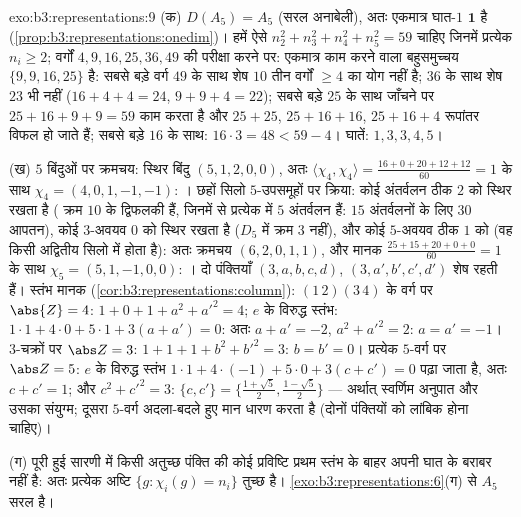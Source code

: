 \begin{solution}{exo:b3:representations:9}
(क) $D(A_5) = A_5$ (सरल अनाबेली), अतः एकमात्र घात-$1$  $\mathbf 1$ है (\cref{prop:b3:representations:onedim})।
हमें ऐसे $n_2^2 + n_3^2
+ n_4^2 + n_5^2 = 59$ चाहिए जिनमें प्रत्येक $n_i \geq 2$; वर्गों $4, 9, 16, 25, 36, 49$ की परीक्षा
करने पर: एकमात्र काम करने वाला बहुसमुच्चय $\{9, 9, 16, 25\}$ है: सबसे बड़े वर्ग
$49$ के साथ शेष $10$ तीन वर्गों $\geq 4$ का योग नहीं है; $36$ के
साथ शेष $23$ भी नहीं ($16 + 4 + 4 = 24$, $9 + 9 + 4 = 22$); सबसे बड़े $25$ के साथ जाँचने
पर $25 + 16 + 9 + 9 = 59$ काम करता है और $25 +
25$, $25 + 16 + 16$, $25 + 16 + 4$ रूपांतर विफल हो जाते
हैं; सबसे बड़े $16$ के साथ: $16\cdot3 = 48 < 59 - 4$। घातें: $1, 3, 3, 4, 5$।

(ख) $5$ बिंदुओं पर क्रमचय: स्थिर बिंदु $(5, 1, 2, 0, 0)$, अतः $\langle\chi_4,\chi_4\rangle = \frac{16 + 0 + 20 + 12 + 12}{60}
= 1$ के साथ
$\chi_4 = (4, 0, 1, -1, -1)$: । छहों सिलो $5$-उपसमूहों पर क्रिया: कोई अंतर्वलन
ठीक $2$ को स्थिर रखता है ( क्रम $10$ के द्विफलकी हैं,
जिनमें से प्रत्येक में $5$ अंतर्वलन हैं: $15$ अंतर्वलनों के लिए
$30$ आपतन), कोई $3$-अवयव $0$ को स्थिर रखता है ($D_5$ में क्रम
$3$ नहीं), और कोई $5$-अवयव ठीक $1$ को (वह किसी अद्वितीय सिलो
में होता है): अतः क्रमचय  $(6, 2, 0, 1, 1)$, और मानक $\frac{25 + 15 + 20 + 0 + 0}{60} =
1$ के साथ $\chi_5 =
(5, 1, -1, 0, 0)$:
। दो पंक्तियाँ $(3, a, b, c, d)$, $(3, a', b', c',
d')$ शेष रहती हैं। स्तंभ मानक (\cref{cor:b3:representations:column}):
$(1\,2)(3\,4)$ के वर्ग पर $\abs{Z} = 4$: $1 + 0 + 1 + a^2 + a'^2 = 4$; $e$ के विरुद्ध स्तंभ: $1\cdot1 + 4\cdot 0 + 5\cdot1 + 3(a + a') =
0$: अतः
$a + a' = -2$, $a^2 + a'^2 = 2$: $a = a' = -1$। $3$-चक्रों पर $\abs Z = 3$: $1 + 1 + 1 + b^2 + b'^2 = 3$: $b = b'
= 0$। प्रत्येक
$5$-वर्ग पर $\abs Z = 5$: $e$ के विरुद्ध स्तंभ $1\cdot 1 + 4\cdot(-1) + 5\cdot 0 + 3(c + c') = 0$ पढ़ा जाता है, अतः
$c + c' = 1$; और $c^2 + c'^2 = 3$: $\{c, c'\} = \bigl\{\frac{1+\sqrt5}2,
\frac{1-\sqrt5}2\bigr\}$ --- अर्थात् स्वर्णिम अनुपात और उसका संयुग्म;
दूसरा $5$-वर्ग अदला-बदले हुए मान धारण करता है (दोनों पंक्तियों
को लांबिक होना चाहिए)।

(ग) पूरी हुई सारणी में किसी अतुच्छ पंक्ति की कोई प्रविष्टि प्रथम
स्तंभ के बाहर अपनी घात के बराबर नहीं है: अतः प्रत्येक अष्टि $\{g :
\chi_i(g) = n_i\}$
तुच्छ है। \cref{exo:b3:representations:6}(ग) से $A_5$ सरल है।
\end{solution}

